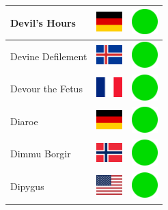 \documentclass[12pt, a4paper, twoside]{report}
\begin{document}
\begin{center}
\begin{longtable}{|p{5cm}|p{2cm}|p{2cm}|}
 Devil's Hours                                              & \includegraphics[width=1cm]{../img/flags/de} &   \includegraphics[width=1cm]{../likes/y} \\ \hline
 Devine Defilement                                          & \includegraphics[width=1cm]{../img/flags/is} &   \includegraphics[width=1cm]{../likes/y} \\ \hline
 Devour the Fetus                                           & \includegraphics[width=1cm]{../img/flags/fr} &   \includegraphics[width=1cm]{../likes/y} \\ \hline
 Diaroe                                                     & \includegraphics[width=1cm]{../img/flags/de} &   \includegraphics[width=1cm]{../likes/y} \\ \hline
 Dimmu Borgir                                               & \includegraphics[width=1cm]{../img/flags/no} &   \includegraphics[width=1cm]{../likes/y} \\ \hline
 Dipygus                                                    & \includegraphics[width=1cm]{../img/flags/us} &   \includegraphics[width=1cm]{../likes/y} \\ \hline

\end{longtable}
\end{center}
\end{document}
